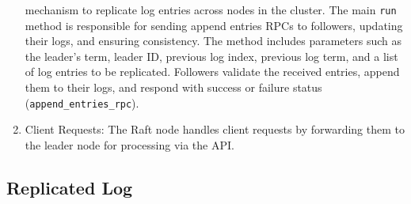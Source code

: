 \documentclass{article}
\begin{document}
\begin{enumerate}
    mechanism to replicate log entries across nodes in the cluster. The main \texttt{run} 
    method is responsible for sending append entries RPCs to followers, updating their logs, 
    and ensuring consistency. The method includes parameters such as the leader's term, leader 
    ID, previous log index, previous log term, and a list of log entries to be replicated. 
    Followers validate the received entries, append them to their logs, and respond with 
    success or failure status (\texttt{append\_entries\_rpc}).
    \item Client Requests: The Raft node handles client requests by forwarding them to the 
    leader node for processing via the API.
\end{enumerate}

\subsection{Replicated Log}
\end{document}
